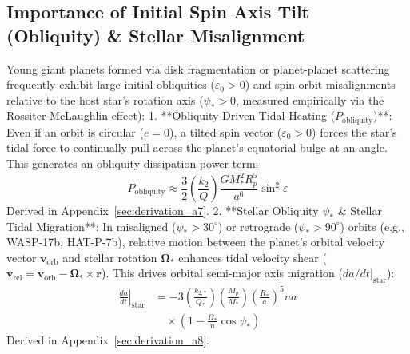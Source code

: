\subsection{Importance of Initial Spin Axis Tilt (Obliquity) \& Stellar Misalignment}
Young giant planets formed via disk fragmentation or planet-planet scattering frequently exhibit large initial obliquities ($\varepsilon_0 > 0$) and spin-orbit misalignments relative to the host star's rotation axis ($\psi_* > 0$, measured empirically via the Rossiter-McLaughlin effect):
1. **Obliquity-Driven Tidal Heating ($P_{\mathrm{obliquity}}$)**:
   Even if an orbit is circular ($e=0$), a tilted spin vector ($\varepsilon_0 > 0$) forces the star's tidal force to continually pull across the planet's equatorial bulge at an angle. This generates an obliquity dissipation power term:
   \begin{equation}
   P_{\mathrm{obliquity}} \approx \frac{3}{2} \left(\frac{k_2}{Q}\right) \frac{G M_*^2 R_p^5}{a^6} \sin^2\varepsilon
   \end{equation}
   Derived in Appendix~\ref{sec:derivation_a7}.
2. **Stellar Obliquity $\psi_*$ \& Stellar Tidal Migration**:
   In misaligned ($\psi_* > 30^\circ$) or retrograde ($\psi_* > 90^\circ$) orbits (e.g., WASP-17b, HAT-P-7b), relative motion between the planet's orbital velocity vector $\mathbf{v}_{\text{orb}}$ and stellar rotation $\mathbf{\Omega}_*$ enhances tidal velocity shear ($\mathbf{v}_{\text{rel}} = \mathbf{v}_{\text{orb}} - \mathbf{\Omega}_* \times \mathbf{r}$). This drives orbital semi-major axis migration ($da/dt|_{\text{star}}$):
   \begin{equation}
   \begin{aligned}
   \left.\frac{da}{dt}\right|_{\text{star}} &= -3 \left(\frac{k_{2, *}}{Q_*}\right) \left(\frac{M_p}{M_*}\right) \left(\frac{R_*}{a}\right)^5 n a \\
   &\quad \times \left(1 - \frac{\Omega_*}{n} \cos\psi_*\right)
   \end{aligned}
   \end{equation}
   Derived in Appendix~\ref{sec:derivation_a8}.

